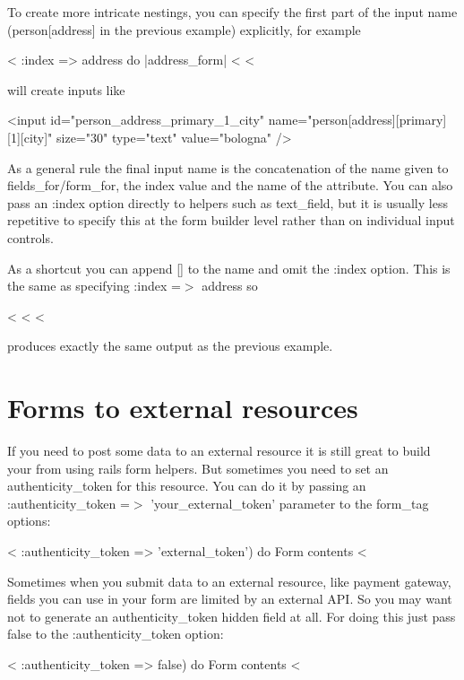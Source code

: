 \documentclass[10pt]{book}
\newenvironment{code}{%
  \scriptsize
    \verbatim
}{%
    \endverbatim
    \newline
}
\begin{document}
To create more intricate nestings, you can specify the first part of the input name (person[address] in the previous example) explicitly, for example
\begin{code}
<%
               :index => address do |address_form| %
  <%
<%
\end{code}

will create inputs like
\begin{code}
<input id="person_address_primary_1_city" 
       name="person[address][primary][1][city]"
       size="30" type="text" value="bologna" />
\end{code}

As a general rule the final input name is the concatenation of the name given to fields\_for/form\_for, the index value and the name of the attribute. You can also pass an :index option directly to helpers such as text\_field, but it is usually less repetitive to specify this at the form builder level rather than on individual input controls.

As a shortcut you can append [] to the name and omit the :index option. This is the same as specifying :index =$>$ address so
\begin{code}
<%
  <%
<%
\end{code}

produces exactly the same output as the previous example.

\section{ Forms to external resources}

If you need to post some data to an external resource it is still  great to build your from using rails form helpers. But sometimes you  need to set an authenticity\_token for this resource. You can do it by passing an :authenticity\_token =$>$ 'your\_external\_token' parameter to the form\_tag options:
\begin{code}
<%
    :authenticity_token => 'external_token') do %
  Form contents
<%
\end{code}

Sometimes when you submit data to an external resource, like payment  gateway, fields you can use in your form are limited by an external API. So you may want not to generate an authenticity\_token hidden field at all. For doing this just pass false to the :authenticity\_token option:
\begin{code}
<%
    :authenticity_token => false) do %
  Form contents
<%
\end{code}
\end{document}
